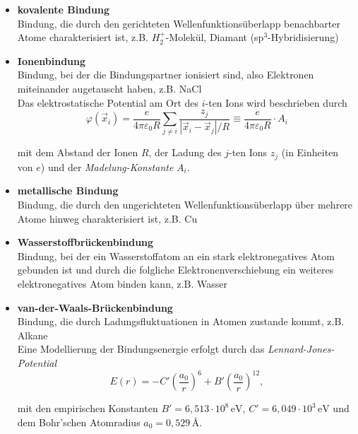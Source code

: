 \documentclass{article}
\newcommand{\lr}[1]{\left(#1\right)}
\begin{document}
	\begin{itemize}
		\item \textbf{kovalente Bindung}\\
		Bindung, die durch den gerichteten Wellenfunktionsüberlapp benachbarter Atome charakterisiert ist, z.B. $H_2^+$-Molekül, Diamant (sp$^3$-Hybridisierung)
		
		
		\item \textbf{Ionenbindung}\\
		Bindung, bei der die Bindungspartner ionisiert sind, also Elektronen miteinander augetauscht haben, z.B. NaCl\\
		Das elektrostatische Potential am Ort des $i$-ten Ions wird beschrieben durch
			\begin{equation}
				\varphi(\vec{x}_i) = \frac{e}{4\pi\varepsilon_0 R} \sum_{j \neq i} \frac{z_j}{|\vec{x}_i - \vec{x}_j| / R} \equiv \frac{e}{4\pi\varepsilon_0 R} \cdot A_i
			\end{equation}
		
		mit dem Abstand der Ionen $R$, der Ladung des $j$-ten Ions $z_j$ (in Einheiten von $e$) und der \textit{Madelung-Konstante} $A_i$.
		
		
		\item \textbf{metallische Bindung}\\
		Bindung, die durch den ungerichteten Wellenfunktionsüberlapp über mehrere Atome hinweg charakterisiert ist, z.B. Cu
		
		
		\item \textbf{Wasserstoffbrückenbindung}\\
		Bindung, bei der ein Wasserstoffatom an ein stark elektronegatives Atom gebunden ist und durch die folgliche Elektronenverschiebung ein weiteres elektronegatives Atom binden kann, z.B. Wasser
		
		
		\item \textbf{van-der-Waals-Brückenbindung}\\
		Bindung, die durch Ladungsfluktuationen in Atomen zustande kommt, z.B. Alkane\\
		Eine Modellierung der Bindungsenergie erfolgt durch das \textit{Lennard-Jones-Potential}
			\begin{equation}
				E(r) = -C'\lr{ \frac{a_0}{r} }^6 + B' \lr{ \frac{a_0}{r} }^{12},
			\end{equation}
		
		mit den empirischen Konstanten $B' = 6,513 \cdot 10^8 \, \text{eV}$, $C' = 6,049 \cdot 10^3 \, \text{eV}$ und dem Bohr'schen Atomradius $a_0 = 0,529 \, \text{\AA}$.
	\end{itemize}
\end{document}
